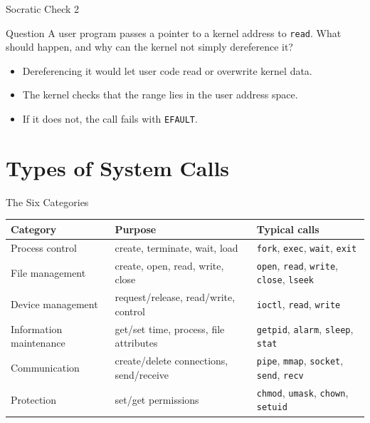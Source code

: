 \documentclass[aspectratio=169]{beamer}
\begin{document}
\begin{frame}{Socratic Check 2}
  \begin{block}{Question}
    A user program passes a pointer to a kernel address to \texttt{read}. What
    should happen, and why can the kernel not simply dereference it?
  \end{block}
  \vspace{0.25cm}
  \begin{itemize}
    \item Dereferencing it would let user code read or overwrite kernel data.
    \item The kernel checks that the range lies in the user address space.
    \item If it does not, the call fails with \texttt{EFAULT}.
  \end{itemize}
\end{frame}

\section{Types of System Calls}


\begin{frame}{The Six Categories}
  \centering
  \footnotesize
  \renewcommand{\arraystretch}{1.3}
  \begin{tabular}{p{}p{}p{}}
    \textbf{Category} & \textbf{Purpose} & \textbf{Typical calls} \\
    \hline
    Process control & create, terminate, wait, load & \texttt{fork}, \texttt{exec},
    \texttt{wait}, \texttt{exit} \\
    File management & create, open, read, write, close & \texttt{open},
    \texttt{read}, \texttt{write}, \texttt{close}, \texttt{lseek} \\
    Device management & request/release, read/write, control & \texttt{ioctl},
    \texttt{read}, \texttt{write} \\
    Information maintenance & get/set time, process, file attributes &
    \texttt{getpid}, \texttt{alarm}, \texttt{sleep}, \texttt{stat} \\
    Communication & create/delete connections, send/receive & \texttt{pipe},
    \texttt{mmap}, \texttt{socket}, \texttt{send}, \texttt{recv} \\
    Protection & set/get permissions & \texttt{chmod}, \texttt{umask},
    \texttt{chown}, \texttt{setuid} \\
  \end{tabular}
  \vspace{0.2cm}
\end{frame}
\end{document}
